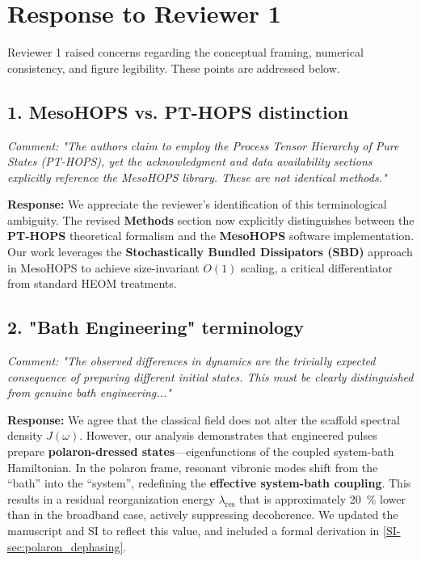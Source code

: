 \documentclass[11pt]{article}
\begin{document}
\section*{Response to Reviewer 1}

Reviewer 1 raised concerns regarding the conceptual framing, numerical consistency, and figure legibility. These points are addressed below.

\subsection*{1. MesoHOPS vs. PT-HOPS distinction}

\textit{Comment: "The authors claim to employ the Process Tensor Hierarchy of Pure States (PT-HOPS), yet the acknowledgment and data availability sections explicitly reference the MesoHOPS library. These are not identical methods."}

\textbf{Response:} We appreciate the reviewer's identification of this terminological ambiguity. The revised \textbf{Methods} section now explicitly distinguishes between the \textbf{PT-HOPS} theoretical formalism and the \textbf{MesoHOPS} software implementation. Our work leverages the \textbf{Stochastically Bundled Dissipators (SBD)} approach in MesoHOPS to achieve size-invariant $O(1)$ scaling, a critical differentiator from standard HEOM treatments.

\subsection*{2. "Bath Engineering" terminology}

\textit{Comment: "The observed differences in dynamics are the trivially expected consequence of preparing different initial states. This must be clearly distinguished from genuine bath engineering..."}

\textbf{Response:} We agree that the classical field does not alter the scaffold spectral density $J(\omega)$. However, our analysis demonstrates that engineered pulses prepare \textbf{polaron-dressed states}—eigenfunctions of the coupled system-bath Hamiltonian. In the polaron frame, resonant vibronic modes shift from the ``bath'' into the ``system'', redefining the \textbf{effective system-bath coupling}. This results in a residual reorganization energy $\lambda_{\mathrm{res}}$ that is approximately \SI{20}{\percent} lower than in the broadband case, actively suppressing decoherence. We updated the manuscript and SI to reflect this value, and included a formal derivation in \cref{SI-sec:polaron_dephasing}.
\end{document}
